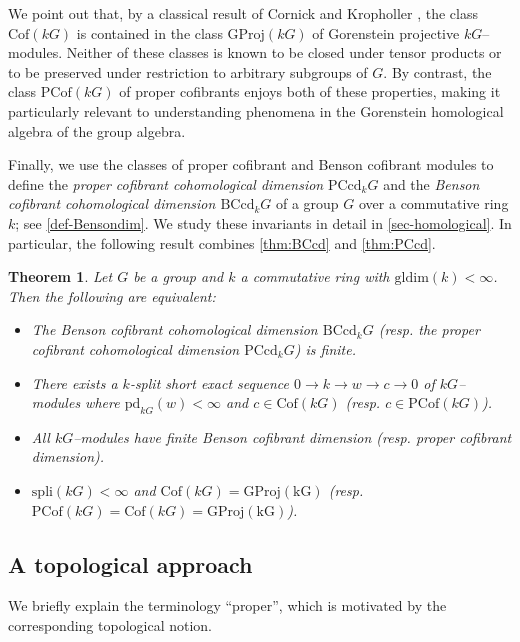\documentclass{amsart}
\numberwithin{equation}{section}%
\newtheorem{thmx}{Theorem}
\theoremstyle{remark}
\begin{document}
We point out that, by a classical result of Cornick and Kropholler \cite{CP}, the class $\mathrm{Cof}(kG)$ is contained in the class $\mathrm{GProj}(kG)$ of Gorenstein projective $kG$--modules. Neither of these classes is known to be closed under tensor products or to be preserved under restriction to arbitrary subgroups of $G$. By contrast, the class $\mathrm{PCof}(kG)$ of proper cofibrants enjoys both of these properties, making it particularly relevant to understanding phenomena in the Gorenstein homological algebra of the group algebra.

Finally, we use the classes of proper cofibrant and Benson cofibrant modules to define the \textit{proper cofibrant cohomological dimension} $\mathrm{PCcd}_kG$ and the \textit{Benson cofibrant cohomological dimension $\mathrm{BCcd}_kG$} of a group $G$ over a commutative ring $k$; see \cref{def-Bensondim}. We study these invariants in detail in \cref{sec-homological}. In particular, the following result combines \cref{thm:BCcd} and \cref{thm:PCcd}. 

\begin{thmx}
    Let $G$ be a group and $k$ a commutative ring with $\mathrm{gldim}(k)<\infty$. Then the following are equivalent:
\begin{itemize}
    \item[(i)] The Benson cofibrant cohomological dimension $\mathrm{BCcd}_{k}G$ \textnormal{(}resp. the proper cofibrant cohomological dimension $\mathrm{PCcd}_kG$\textnormal{)} is finite.
    \item[(ii)] There exists a $k$-split short exact sequence $0\rightarrow k\rightarrow w\rightarrow c\rightarrow 0$ of $kG$--modules where $\mathrm{pd}_{kG}(w)<\infty$ and $c\in\mathrm{Cof}(kG)$ \textnormal{(}resp. $c\in \mathrm{PCof}(kG)$\textnormal{)}.
    \item[(iii)] All $kG$--modules have finite Benson cofibrant dimension \textnormal{(}resp. proper cofibrant dimension\textnormal{)}.
    \item[(iv)] $\mathrm{spli}(kG)<\infty$ and $\mathrm{Cof}(kG)=\mathrm{GProj(kG)}$ \textnormal{(}resp. $\mathrm{PCof}(kG)=\mathrm{Cof}(kG)=\mathrm{GProj(kG)}$\textnormal{)}. 
\end{itemize}
\end{thmx}


\subsection*{A topological approach}
We briefly explain the terminology ``proper'', which is motivated by the corresponding topological notion.
\end{document}

